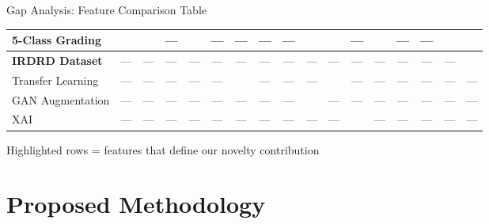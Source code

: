 \documentclass[aspectratio=169, 11pt]{beamer}
\newcommand{\cmark}{\textcolor{darkgreen}{\ding{51}}}
\newcommand{\xmark}{\textcolor{alertred}{---}}
\begin{document}
\begin{frame}{Gap Analysis: Feature Comparison Table}
{\begin{tabular}{|l|*{15}{c|}c|}
    \hline
    5-Class Grading    & \cmark&\cmark&\xmark&\cmark&\xmark&\xmark&\xmark&\xmark&\cmark&\cmark&\xmark&\cmark&\xmark&\xmark&\cmark& \cmark \\
    \hline
    \cellcolor{yellow!40}\textbf{IRDRD Dataset}
                       & \xmark&\xmark&\xmark&\xmark&\xmark&\xmark&\xmark&\xmark&\xmark&\xmark&\xmark&\xmark&\xmark&\xmark&\xmark& \cmark \\
    \hline
    Transfer Learning  & \xmark&\xmark&\xmark&\xmark&\xmark&\cmark&\xmark&\xmark&\xmark&\cmark&\xmark&\xmark&\xmark&\xmark&\xmark& \xmark \\
    \hline
    GAN Augmentation   & \xmark&\xmark&\xmark&\xmark&\xmark&\xmark&\xmark&\xmark&\cmark&\xmark&\xmark&\xmark&\xmark&\xmark&\xmark& \xmark \\
    \hline
    XAI                & \xmark&\xmark&\xmark&\xmark&\xmark&\xmark&\xmark&\xmark&\xmark&\xmark&\cmark&\xmark&\xmark&\xmark&\xmark& \xmark \\
    \hline
  \end{tabular}
  }
  \vspace{2pt}
  \begin{center}
    \footnotesize \colorbox{yellow!40}{Highlighted rows} = features that define our novelty contribution
  \end{center}
\end{frame}

\section{Proposed Methodology}
\end{document}
